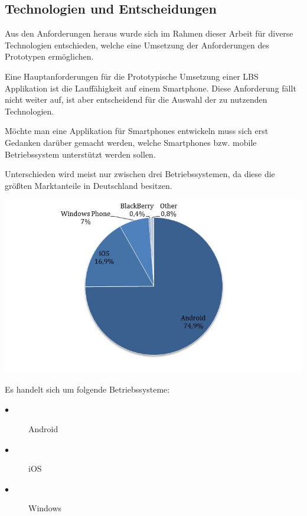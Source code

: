 \subsection{Technologien und Entscheidungen}

Aus den Anforderungen heraus wurde sich im Rahmen dieser Arbeit für diverse Technologien entschieden, welche eine Umsetzung der Anforderungen des Prototypen ermöglichen.


Eine Hauptanforderungen für die Prototypische Umsetzung einer LBS Applikation ist 
die Lauffähigkeit auf einem Smartphone. Diese Anforderung fällt nicht weiter auf, 
ist aber entscheidend für die Auswahl der zu nutzenden Technologien.

Möchte man eine Applikation für Smartphones entwickeln muss sich erst Gedanken 
darüber gemacht werden, welche Smartphones bzw. mobile Betriebssystem unterstützt 
werden sollen.

Unterschieden wird meist nur zwischen drei Betriebssystemen, da diese die größten 
Marktanteile in Deutschland besitzen. 

\includegraphics[width=1\textwidth]{ref/images/marktanteil.jpg} 


Es handelt sich um folgende Betriebssysteme: 
\begin{description}
  \item[$\bullet$] Android
  \item[$\bullet$] iOS
  \item[$\bullet$] Windows
\end{description}


